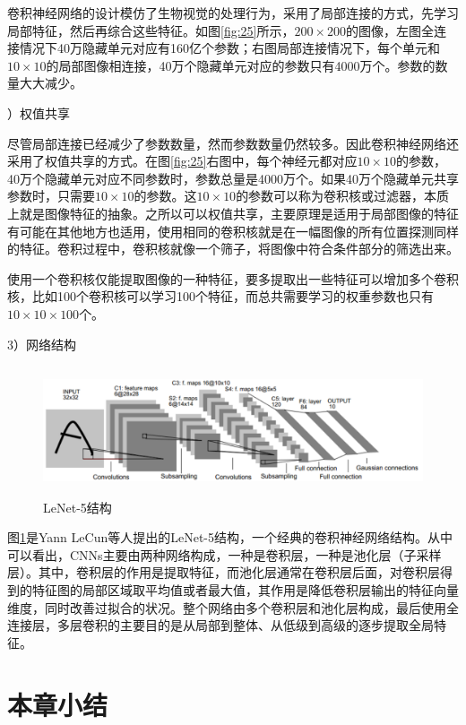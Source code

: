 卷积神经网络的设计模仿了生物视觉的处理行为，采用了局部连接的方式，先学习局部特征，然后再综合这些特征。如图\ref{fig:25}所示，$200 \times 200$的图像，左图全连接情况下40万隐藏单元对应有160亿个参数；右图局部连接情况下，每个单元和$10 \times 10$的局部图像相连接，40万个隐藏单元对应的参数只有4000万个。参数的数量大大减少。

）权值共享

尽管局部连接已经减少了参数数量，然而参数数量仍然较多。因此卷积神经网络还采用了权值共享的方式。在图\ref{fig:25}右图中，每个神经元都对应$10 \times 10$的参数， 40万个隐藏单元对应不同参数时，参数总量是4000万个。如果40万个隐藏单元共享参数时，只需要$10 \times 10$的参数。这$10 \times 10$的参数可以称为卷积核或过滤器，本质上就是图像特征的抽象。之所以可以权值共享，主要原理是适用于局部图像的特征有可能在其他地方也适用，使用相同的卷积核就是在一幅图像的所有位置探测同样的特征。卷积过程中，卷积核就像一个筛子，将图像中符合条件部分的筛选出来。

使用一个卷积核仅能提取图像的一种特征，要多提取出一些特征可以增加多个卷积核，比如100个卷积核可以学习100个特征，而总共需要学习的权重参数也只有$10 \times 10 \times 100$个。

3）网络结构

\begin{figure}[thb]
\centering
\includegraphics[height=1.5in]{./figures/2/2-6}
\caption{LeNet-5结构}
\label{fig:26}
\end{figure}

图\ref{fig:26}是Yann LeCun等人提出的LeNet-5结构，一个经典的卷积神经网络结构。从中可以看出，CNNs主要由两种网络构成，一种是卷积层，一种是池化层（子采样层）。其中，卷积层的作用是提取特征，而池化层通常在卷积层后面，对卷积层得到的特征图的局部区域取平均值或者最大值，其作用是降低卷积层输出的特征向量维度，同时改善过拟合的状况。整个网络由多个卷积层和池化层构成，最后使用全连接层，多层卷积的主要目的是从局部到整体、从低级到高级的逐步提取全局特征。



\section{本章小结}


